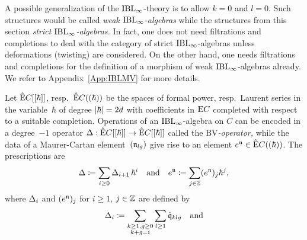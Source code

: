 \documentclass[\MainFolder/Text.tex]{subfiles}
\begin{document}
\begin{Remark}\label{Rem:BVForm}
\begin{RemarkList}
\item A possible generalization of the $\mathrm{IBL}_\infty$-theory is to allow $k=0$ and $l=0$.
Such structures would be called \emph{weak $\mathrm{IBL}_\infty$-algebras} while the structures from this section \emph{strict $\mathrm{IBL}_\infty$-algebras.}
In fact, one does not need filtrations and completions to deal with the category of strict $\mathrm{IBL}_\infty$-algebras unless deformations (twisting) are considered.
On the other hand, one needs filtrations and completions for the definition of a morphism of weak $\mathrm{IBL}_\infty$-algebras already.
We refer to Appendix~\ref{App:IBLMV} for more details. 
\item Let $\hat{\mathrm{E}} C[[\hbar]]$, resp.~$\hat{\mathrm{E}} C((\hbar))$ be the spaces of formal power, resp.~Laurent series in the variable~$\hbar$ of degree $|\hbar| = 2d$ with coefficients in $\mathrm{E} C$ completed with respect to a suitable completion.
Operations of an $\mathrm{IBL}_\infty$-algebra on $C$ can be encoded in a degree~$-1$ operator $\operatorname{\Delta}: \hat{\mathrm{E}} C[[\hbar]] \rightarrow \hat{\mathrm{E}} C[[\hbar]]$ called the \emph{$\mathrm{BV}$-operator,} while the data of a Maurer-Cartan element~$(\mathfrak{n}_{lg})$ give rise to an element $e^{\mathfrak{n}}\in \hat{\mathrm{E}} C((\hbar))$. The prescriptions are
\[ \operatorname{\Delta} \coloneqq \sum_{i\ge 0}\operatorname{\Delta}_{i+1} \hbar^{i}\quad\text{and}\quad e^{\mathfrak{n}} \coloneqq \sum_{j\in \mathbb{Z}} (e^{\mathfrak{n}})_j \hbar^{j}, \]
where $\operatorname{\Delta}_i$ and $(e^{\mathfrak{n}})_j$ for $i\ge 1$, $j\in \mathbb{Z}$ are defined by 
\begin{align*}
\BVOp_i & \coloneqq \sum_{\substack{k\ge 1, g\ge 0 \\k+g=i}} \sum_{l\ge 1} \hat{\OPQ}_{klg}\quad\text{and} \\

\end{align*}
\end{RemarkList}
\end{Remark}
\end{document}
